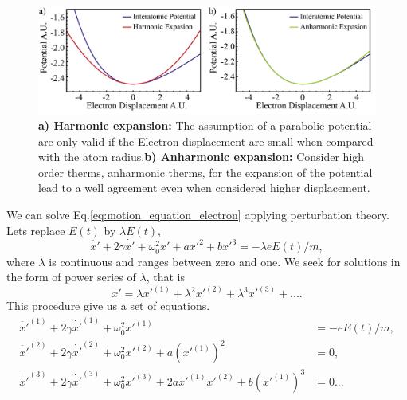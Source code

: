 \begin{figure}[h!]
    \centering
    \includegraphics[width = 16cm]{figuras/Dissertation_interatomic_expassion.jpg}
    \caption{\textbf{a) Harmonic expansion:} The assumption of a parabolic potential are only valid if the Electron displacement are small when compared with the atom radius.\textbf{b) Anharmonic expansion:} Consider high order therms, anharmonic therms, for the expansion of the potential lead to a well agreement even when considered higher displacement.}
    \label{fig:expanssion}
\end{figure}
We can solve Eq.\ref{eq:motion_equation_electron} applying perturbation theory. Lets replace $E(t)$ by $\lambda E(t)$, %
\begin{equation}
    \ddot{x'} + 2\gamma\dot{x'} + \omega_0^2x'+ax'^2+bx'^3 = -\lambda eE(t)/m,
    \label{eq:pertubed_equation_electron}
\end{equation}
where $\lambda$ is continuous and ranges between zero and one. We seek for solutions in the form of power series of $\lambda$, that is 
\begin{equation}
    x' = \lambda x'^{(1)} + \lambda^2 x'^{(2)} + \lambda^3 x'^{(3)} +....
    \label{eq:x_pertubation_expanssion}
\end{equation}
This procedure give us a set of equations.
\begin{subequations}
    \begin{align}
        \ddot{x'}^{(1)} + 2\gamma\dot{x'}^{(1)} + \omega_0^2x'^{(1)} &= -eE(t)/m,\label{eq:first_order_pertubation}\\
        \ddot{x'}^{(2)} + 2\gamma\dot{x'}^{(2)} + \omega_0^2x'^{(2)}+a\left(x'^{(1)}\right)^2 &= 0,\label{eq:second_order_pertubation}\\
        \ddot{x'}^{(3)} + 2\gamma\dot{x'}^{(3)} + \omega_0^2x'^{(3)}+     2ax'^{(1)}x'^{(2)} +b\left(x'^{(1)}\right)^3 &= 0\label{eq:thirdt_order_pertubation}...    
    \end{align}
\end{subequations}

